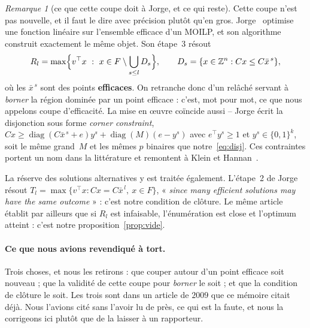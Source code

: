 \documentclass[11pt,a4paper]{article}
\theoremstyle{plain}
\theoremstyle{remark}
\newtheorem{remark}{Remarque}
\begin{document}
\begin{remark}[ce que cette coupe doit à Jorge, et ce qui reste]
\label{rem:anteriorite}
Cette coupe n'est pas nouvelle, et il faut le dire avec précision plutôt
qu'en gros. Jorge~\cite{jorge2009} optimise une fonction linéaire sur
l'ensemble efficace d'un MOILP, et son algorithme construit exactement le
même objet. Son étape~3 résout
\[
  R_l=\max\Bigl\{v^{\top}x\ :\ x\in F\setminus\bigcup_{s\le l}D_s\Bigr\},
  \qquad D_s=\{x\in\mathbb{Z}^n : Cx\le C\bar x^{\,s}\},
\]
où les $\bar x^{\,s}$ sont des points \textbf{efficaces}. On retranche donc
d'un relâché servant à \emph{borner} la région dominée par un point
efficace : c'est, mot pour mot, ce que nous appelons coupe d'efficacité.
La mise en {\oe}uvre coïncide aussi -- Jorge écrit la disjonction sous
forme \emph{corner constraint}, $Cx\ge\operatorname{diag}(C\bar x^{\,s}+e)
y^s+\operatorname{diag}(M)(e-y^s)$ avec $e^{\top}y^s\ge 1$ et
$y^s\in\{0,1\}^k$, soit le même grand~$M$ et les mêmes $p$ binaires que
notre~\eqref{eq:disj}. Ces contraintes portent un nom dans la littérature
et remontent à Klein et Hannan~\cite{klein1982}.

La réserve des solutions alternatives y est traitée également. L'étape~2
de Jorge résout $T_l=\max\{v^{\top}x : Cx=C\bar x^{\,l},\ x\in F\}$,
« \emph{since many efficient solutions may have the same outcome} » : c'est
notre condition de clôture. Le même article établit par ailleurs que si
$R_l$ est infaisable, l'énumération est close et l'optimum atteint : c'est
notre proposition~\ref{prop:vide}.

\paragraph{Ce que nous avions revendiqué à tort.} Trois choses, et nous les
retirons : que couper autour d'un point efficace soit nouveau ; que la
validité de cette coupe pour \emph{borner} le soit ; et que la condition de
clôture le soit. Les trois sont dans un article de $2009$ que ce mémoire
citait déjà. Nous l'avions cité sans l'avoir lu de près, ce qui est la
faute, et nous la corrigeons ici plutôt que de la laisser à un rapporteur.


\end{remark}
\end{document}
